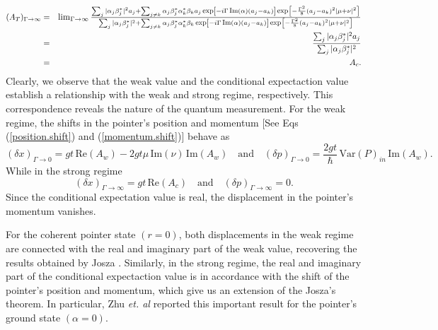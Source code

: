 \documentclass[aps,pra,preprint,superscriptaddress, showpacs]{revtex4-2}
\newcommand*{\Scale}[2][4]{\scalebox{#1}{$#2$}}%
\newcommand*{\Resize}[2]{\resizebox{#1}{!}{$#2$}}%
\begin{document}
\begin{eqnarray}
(A_{T})_{\Gamma \rightarrow \infty}&=&\Resize{13cm}{\lim_{\Gamma\rightarrow \infty}\frac{\sum_{j}|\alpha_{j}\beta_{j}^{*}|^2 a_{j}+\sum_{j \neq k}\alpha_{j}\beta_{j}^{*}\alpha_{k}^{*}\beta_{k}a_{j}\,\Scale[0.82]{\textrm{exp}}\left[-i\Gamma\,\Scale[0.82]{\textrm{Im}}(\alpha)\left(a_{j}-a_{k}\right)\right]\,\Scale[0.82]{\textrm{exp}}\left[ -\frac{\Gamma^2}{8}\left(a_{j}-a_{k}\right)^2|\mu+\nu|^2\right]}{\sum_{j}|\alpha_{j}\beta_{j}^{*}|^2+\sum_{j\neq k}\alpha_{j}\beta_{j}^{*}\alpha_{k}^{*}\beta_{k}\,\Scale[0.82]{\textrm{exp}}\left[-i\Gamma\,\Scale[0.82]{\textrm{Im}}(\alpha)\left(a_{j}-a_{k}\right)\right]\,\Scale[0.82]{\textrm{exp}}\left[ -\frac{\Gamma^2}{8}\left(a_{j}-a_{k}\right)^2|\mu+\nu|^2\right]}}\nonumber \\
&=&\frac{\sum_{j}|\alpha_{j}\beta_{j}^{*}|^2 a_{j}}{\sum_{j}|\alpha_{j}\beta_{j}^{*}|^2} \nonumber \\
&=&A_{c}. 
\end{eqnarray}
Clearly, we observe that the weak value and the conditional expectaction value establish a relationship with the weak and strong regime, respectively. This correspondence reveals the nature of the quantum measurement. For the weak regime, the shifts in the pointer's position and momentum [See Eqs (\ref{position.shift}) and (\ref{momentum.shift})] behave as
\begin{equation}\label{weak.shift}
(\delta x)_{\Gamma\rightarrow 0}=gt \,\textrm{Re}(A_{w})-2gt\mu\,\textrm{Im}(\nu)\,\textrm{Im}(A_{w})\quad \text{and} \quad  (\delta p)_{\Gamma\rightarrow 0}=\frac{2gt}{\hbar}\,\textrm{Var}(P)_{in}\, \textrm{Im}(A_{w}).
\end{equation}
While in the strong regime
\begin{equation}\label{strong.shift}
(\delta x)_{\Gamma\rightarrow \infty}=gt \,\textrm{Re}(A_{c})\quad \text{and} \quad (\delta p)_{\Gamma\rightarrow \infty}=0.
\end{equation}
Since the conditional expectation value is real, the displacement in the pointer's momentum vanishes. 

For the coherent pointer state $(r=0)$, both displacements in the weak regime are connected with the real and imaginary part of the weak value, recovering the results obtained by Josza \cite{jozsa2007complex}. Similarly, in the strong regime, the real and imaginary part of the conditional expectaction value is in accordance with the shift of the pointer's position and momentum, which give us an extension of the Josza's theorem. In particular, Zhu \textit{et. al} \cite{zhu2011quantum} reported this important result for the pointer's ground state $(\alpha=0)$.
\end{document}
